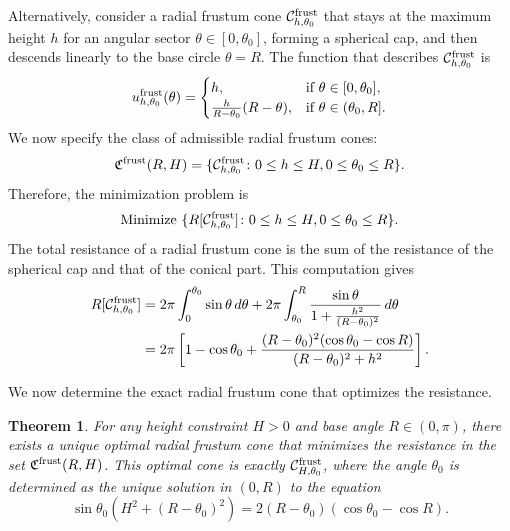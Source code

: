 \documentclass[a4paper,12pt]{amsart}
\theoremstyle{plain}
\newtheorem{theorem}{Theorem}[section]
\theoremstyle{definition}
\begin{document}
 
Alternatively, consider a radial frustum cone $\mathcal{C}^{\rm frust}_{h,\theta_0}$ that stays at the maximum height $h$ for an angular sector $\theta \in [0, \theta_0]$, forming a spherical cap, and then descends linearly to the base circle $\theta=R$. The function that describes $\mathcal{C}^{\rm frust}_{h,\theta_0}$ is 
\begin{equation*}
 u^{\rm frust}_{h,\theta_0}(\theta) = 
 \begin{cases} 
 h, & \text{if } \theta \in [0, \theta_0], \\
 \frac{h}{R - \theta_0}(R - \theta), & \text{if } \theta \in (\theta_0, R].
 \end{cases}
\end{equation*}
We now specify the class of admissible radial frustum cones:
$$\mathfrak{C}^{\rm frust}(R,H)=\{\mathcal{C}^{\rm frust}_{h,\theta_0}\colon 0\leq h\leq H, 0\leq \theta_0\leq R\}.$$
Therefore, the minimization problem  is 
$$\textrm{Minimize }\{R[\mathcal{C}^{\rm frust}_{h,\theta_0}]\colon 0\leq h\leq H, 0\leq\theta_0\leq R\}.$$
The total resistance of a radial  frustum cone is the sum of the resistance of the spherical cap and that of the conical part. This computation gives 
\begin{equation}\label{fr1}
\begin{split}
 R[\mathcal{C}^{\rm frust}_{h,\theta_0}] &= 2\pi \int_0^{\theta_0} \sin \theta \, d\theta + 2\pi \int_{\theta_0}^R \frac{\sin \theta}{1 + \frac{h^2}{(R - \theta_0)^2}} \, d\theta \\
 &= 2\pi \left[ 1 - \cos \theta_0 + \frac{(R-\theta_0)^2(\cos \theta_0 - \cos R)}{(R-\theta_0)^2+h^2} \right].
\end{split}
\end{equation}




We now determine the exact radial frustum cone that optimizes the resistance.

\begin{theorem}
For any height constraint $H > 0$ and base angle $R \in (0, \pi)$, there exists a unique optimal radial frustum cone that minimizes the resistance in the set $\mathfrak{C}^{\rm frust}(R,H)$. This optimal cone is exactly $\mathcal{C}^{\rm frust}_{H,\theta_0}$, where the angle $\theta_0$ is determined as the unique solution in $(0, R)$ to the equation
\begin{equation}\label{optimal}
 \sin \theta_0 (H^2+(R-\theta_0)^2) = 2(R-\theta_0) (\cos \theta_0 - \cos R).
\end{equation}
 \end{theorem}
\end{document}
